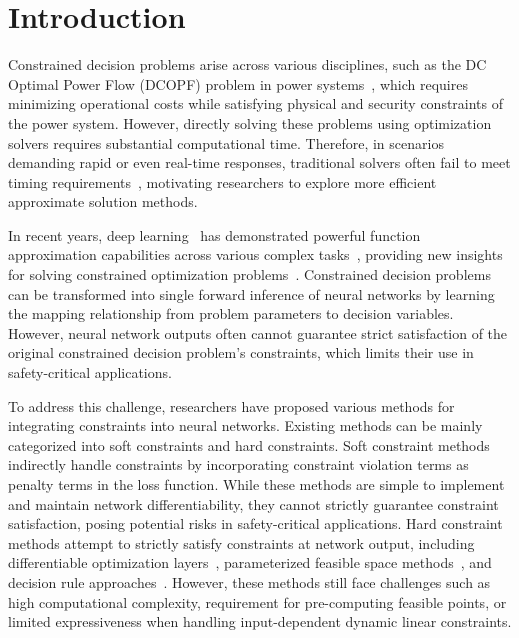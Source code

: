 \documentclass[letterpaper]{article} %
\begin{document}
\section{Introduction}

Constrained decision problems arise across various disciplines, such as the DC Optimal Power Flow (DCOPF) problem in power systems~\cite{carpentier1962contribution}, which requires minimizing operational costs while satisfying physical and security constraints of the power system. However, directly solving these problems using optimization solvers requires substantial computational time. Therefore, in scenarios demanding rapid or even real-time responses, traditional solvers often fail to meet timing requirements~\cite{scutari2018parallel}, motivating researchers to explore more efficient approximate solution methods.

In recent years, deep learning~\cite{goodfellow2016deep} has demonstrated powerful function approximation capabilities across various complex tasks~\cite{hornikMultilayerFeedforwardNetworks1989,cybenkoApproximationSuperpositionsSigmoidal1989,lecunDeepLearning2015}, providing new insights for solving constrained optimization problems~\cite{smithNeuralNetworksCombinatorial1999,JMLR:v24:21-0449,houGeneralizeLearnedHeuristics2023,liu2024teaching}. Constrained decision problems can be transformed into single forward inference of neural networks by learning the mapping relationship from problem parameters to decision variables. However, neural network outputs often cannot guarantee strict satisfaction of the original constrained decision problem's constraints, which limits their use in safety-critical applications.

To address this challenge, researchers have proposed various methods for integrating constraints into neural networks. Existing methods can be mainly categorized into soft constraints and hard constraints. Soft constraint methods~\cite{raissiPhysicsinformedNeuralNetworks2019} indirectly handle constraints by incorporating constraint violation terms as penalty terms in the loss function. While these methods are simple to implement and maintain network differentiability, they cannot strictly guarantee constraint satisfaction, posing potential risks in safety-critical applications. Hard constraint methods attempt to strictly satisfy constraints at network output, including differentiable optimization layers~\cite{amosOptNetDifferentiableOptimization2017,dontiDC3LearningMethod2021,minHardNetHardConstrainedNeural2025}, parameterized feasible space methods~\cite{tordesillasRAYENImpositionHard2023,zhangEfficientLearningBasedSolver2024}, and decision rule approaches~\cite{constante-floresEnforcingHardLinear2025}. However, these methods still face challenges such as high computational complexity, requirement for pre-computing feasible points, or limited expressiveness when handling input-dependent dynamic linear constraints.
\end{document}
